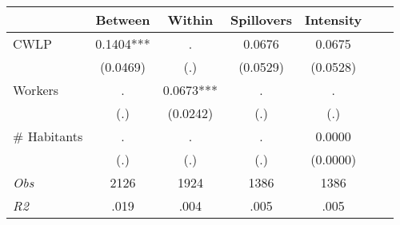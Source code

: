 \begin{tabular}{l*{6}{c}}\hline&\multicolumn{1}{c}{Between}&\multicolumn{1}{c}{Within}&\multicolumn{1}{c}{Spillovers}&\multicolumn{1}{c}{Intensity}\\ \hline 
CWLP & 0.1404*** & . & 0.0676 & 0.0675 \\
 & (0.0469) & (.) & (0.0529) & (0.0528) \\
Workers & . & 0.0673*** & . & . \\
 & (.) & (0.0242) & (.) & (.) \\
\# Habitants & . & . & . & 0.0000 \\
  & (.) & (.) & (.) & (0.0000) \\
\hline \textit{Obs} & 2126 & 1924 & 1386 & 1386  \\ \textit{R2} & .019 & .004 & .005 & .005 \\ \hline \end{tabular}
